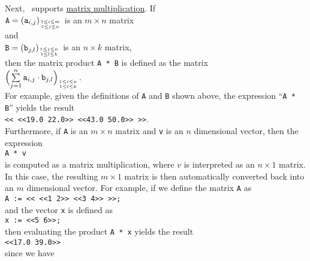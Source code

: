 Next,
\setlx\ supports \href{http://en.wikipedia.org/wiki/Matrix_multiplication}{matrix multiplication}.
If
\\[0.2cm]
\hspace*{1.3cm}
 $\texttt{A} = (\mathtt{a}_{i,j})_{1 \leq i \leq m \atop 1 \leq j \leq n}$ \quad is an $m \times n$ matrix 
\\
and
\\
\hspace*{1.3cm}
$\texttt{B} = (\mathtt{b}_{j,l})_{1 \leq j \leq n \atop 1 \leq l \leq k}$ \quad is an $n \times k$ matrix, 
\\[0.2cm]
then the matrix product \texttt{A * B} is defined as the matrix
\\[0.2cm]
\hspace*{1.3cm}
$\Bigl(\sum\limits_{j=1}^n \texttt{a}_{i,j}\cdot \texttt{b}_{j,l}\Bigr)_{1 \leq i \leq n \atop 1 \leq l \leq k}$.
\\[0.2cm]
For example, given the definitions of
\texttt{A} and \texttt{B} shown above,  the expression ``\texttt{A * B}'' yields the result
\\[0.2cm]
\hspace*{1.3cm}
\texttt{<< <<19.0 22.0>> <<43.0 50.0>> >>}.
\\[0.2cm]
Furthermore, if \texttt{A} is an $m \times n$ matrix and \texttt{v} is an $n$ dimensional vector,
then the expression 
\\[0.2cm]
\hspace*{1.3cm}
\texttt{A * v}
\\[0.2cm]
is computed as a matrix multiplication, where $v$ is interpreted as an $n \times 1$ matrix.  In
this case, the resulting $m \times 1$ matrix is then automatically converted back into an $m$ dimensional vector.
For example, if we define the matrix \texttt{A} as
\\[0.2cm]
\hspace*{1.3cm}
\texttt{A := << <<1 2>> <<3 4>> >>;}
\\[0.2cm]
and the vector \texttt{x} is defined as
\\[0.2cm]
\hspace*{1.3cm}
\texttt{x := <<5 6>>;}
\\[0.2cm]
then evaluating the product \texttt{A * x} yields the result
\\[0.2cm]
\hspace*{1.3cm}
\texttt{<<17.0 39.0>>}
\\[0.2cm]
since we have
\\[0.2cm]
\hspace*{1.3cm}
